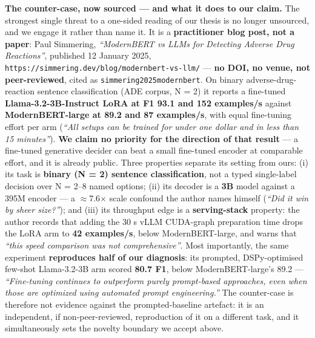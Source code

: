 \documentclass[11pt,a4paper]{article}
\begin{document}
\textbf{The counter-case, now sourced --- and what it does to our claim.} The strongest single threat to a one-sided reading of our thesis is no longer unsourced, and we engage it rather than name it. It is a \textbf{practitioner blog post, not a paper}: Paul Simmering, \emph{``ModernBERT vs LLMs for Detecting Adverse Drug Reactions''}, published 12 January 2025, \texttt{https://simmering.dev/blog/modernbert-vs-llm/} --- \textbf{no DOI, no venue, not peer-reviewed}, cited as \texttt{simmering2025modernbert}\cite{simmering2025modernbert}. On binary adverse-drug-reaction sentence classification (ADE corpus, N = 2) it reports a fine-tuned \textbf{Llama-3.2-3B-Instruct LoRA at F1 93.1 and 152 examples/s} against \textbf{ModernBERT-large at 89.2 and 87 examples/s}, with equal fine-tuning effort per arm (\emph{``All setups can be trained for under one dollar and in less than 15 minutes''}). \textbf{We claim no priority for the direction of that result} --- a fine-tuned generative decider can beat a small fine-tuned encoder at comparable effort, and it is already public. Three properties separate its setting from ours: (i) its task is \textbf{binary (N = 2) sentence classification}, not a typed single-label decision over N = 2--8 named options; (ii) its decoder is a \textbf{3B} model against a 395M encoder --- a $\approx$7.6$\times$ scale confound the author names himself (\emph{``Did it win by sheer size?''}); and (iii) its throughput edge is a \textbf{serving-stack} property: the author records that adding the 30 s vLLM CUDA-graph preparation time drops the LoRA arm to \textbf{42 examples/s}, below ModernBERT-large, and warns that \emph{``this speed comparison was not comprehensive''}. Most importantly, the same experiment \textbf{reproduces half of our diagnosis}: its prompted, DSPy-optimised few-shot Llama-3.2-3B arm scored \textbf{80.7 F1}, below ModernBERT-large's 89.2 --- \emph{``Fine-tuning continues to outperform purely prompt-based approaches, even when those are optimized using automated prompt engineering.''} The counter-case is therefore not evidence against the prompted-baseline artefact: it is an independent, if non-peer-reviewed, reproduction of it on a different task, and it simultaneously sets the novelty boundary we accept above.
\end{document}
